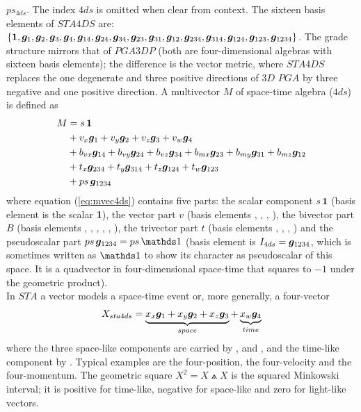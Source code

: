 $ps_{4ds}$. The index $4ds$ is omitted when clear from context. The sixteen basis elements
of $STA4DS$ are: $\{\bm{1}, \bm{g}_{1}, \bm{g}_{2}, \bm{g}_{3}, \bm{g}_{4}, \bm{g}_{14}, \bm{g}_{24}, \bm{g}_{34},
\bm{g}_{23}, \bm{g}_{31}, \bm{g}_{12}, \bm{g}_{234}, \bm{g}_{314}, \bm{g}_{124}, \bm{g}_{123}, \bm{g}_{1234}\}$. The grade
structure mirrors that of $PGA3DP$ (both are four-dimensional algebras with sixteen basis
elements); the difference is the vector metric, where $STA4DS$ replaces the one degenerate
and three positive directions of $3D$ $PGA$ by three negative and one positive direction.
A multivector $M$ of space-time algebra ($4ds$) is defined as
\begin{equation}
    \begin{split}
    M & = s \, \bm{1} \\
      & + v_x\bm{g}_{1} + v_y\bm{g}_{2} + v_z\bm{g}_{3} + v_w\bm{g}_{4} \\
      & + b_{vx}\bm{g}_{14} + b_{vy}\bm{g}_{24} + b_{vz}\bm{g}_{34}
        + b_{mx}\bm{g}_{23} + b_{my}\bm{g}_{31} + b_{mz}\bm{g}_{12} \\
      & + t_{x}\bm{g}_{234} + t_{y}\bm{g}_{314} + t_{z}\bm{g}_{124} + t_{w}\bm{g}_{123} \\
      & + ps \, \bm{g}_{1234}
    \label{eq:mvec4ds}
    \end{split}
\end{equation}
where equation (\ref{eq:mvec4ds}) contains five parts: the scalar component $s \, \bm{1}$
(basis element is the scalar \textbf{1}), the vector part $v$ (basis elements ,
, , ), the bivector part $B$ (basis elements , , ,
, , ), the trivector part $t$ (basis elements , ,
, ) and the pseudoscalar part $ps \, \gv{1234} = ps \, \ps$ (basis element
is $I_{4ds} = \bm{g}_{1234}$, which is sometimes written as $\ps$ to show its character as
pseudoscalar of this space. It is a quadvector in four-dimensional space-time that squares
to $-1$ under the geometric product). \\

In $STA$ a vector models a space-time event or, more generally, a four-vector
\begin{equation}
    X_{sta4ds} = \underbrace{x_x \bm{g}_{1} + x_y \bm{g}_{2} + x_z \bm{g}_{3}}_{space} +
                 \underbrace{x_w \bm{g}_{4}}_{time}
\end{equation}
where the three space-like components are carried by ,  and , and the
time-like component by . Typical examples are the four-position, the four-velocity
and the four-momentum. The geometric square $X^2 = X \wedgedot X$ is the squared Minkowski
interval; it is positive for time-like, negative for space-like and zero for light-like
vectors. \\

